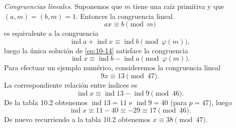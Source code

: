 \documentclass[12pt,a4paper]{book}
\begin{document}
    \begin{ejemplo}
        \textit{Congruencias lineales.} Suponemos que $m$ tiene una raíz primitiva y que
        $(a,m)=(b,m)=1$. Entonces la congruencia lineal
        \begin{equation}\label{eq:10-14}
            ax\equiv b\pmod{m}
        \end{equation}
        es equivalente a la congruencia
        \begin{equation*}
            \operatorname{ind}a+\operatorname{ind}x\equiv\operatorname{ind}b\pmod{\varphi(m)},
        \end{equation*}
        luego la única solución de \eqref{eq:10-14} satisface la congruencia
        \begin{equation*}
            \operatorname{ind}x\equiv\operatorname{ind}b-\operatorname{ind}a\pmod{\varphi(m)}.
        \end{equation*}
        Para efectuar un ejemplo numérico, consideremos la congruencia lineal
        \begin{equation*}
            9x\equiv13\pmod{47}.
        \end{equation*}
        La correspondiente relación entre índices es
        \begin{equation*}
            \operatorname{ind}x\equiv\operatorname{ind}13-\operatorname{ind}9\pmod{46}.
        \end{equation*}
        De la tabla 10.2 obtenemos $\operatorname{ind}13=11$ e $\operatorname{ind}9=40$ (para
        $p=47$), luego
        \begin{equation*}
            \operatorname{ind}x\equiv11-40\equiv-29\equiv17\pmod{46}.
        \end{equation*}
        De nuevo recurriendo a la tabla 10.2 obtenemos $x\equiv38\pmod{47}$.
    \end{ejemplo}
\end{document}
